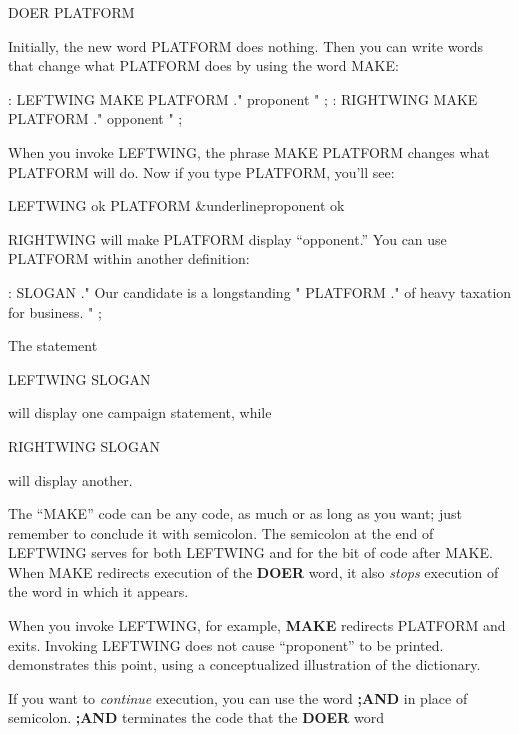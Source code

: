 \begin{Code}
DOER PLATFORM
\end{Code}
Initially, the new word PLATFORM does nothing. Then you can write
words that change what PLATFORM does by using the word MAKE:

\begin{Code}
: LEFTWING   MAKE PLATFORM  ." proponent " ;
: RIGHTWING  MAKE PLATFORM  ." opponent " ;
\end{Code}
When you invoke LEFTWING, the phrase MAKE PLATFORM changes
what PLATFORM will do. Now if you type PLATFORM, you'll see:

\begin{Code}[commandchars=\&\{\}]
LEFTWING ok
PLATFORM &underline{proponent ok}
\end{Code}
RIGHTWING will make PLATFORM display ``opponent.'' You can use
PLATFORM within another definition:

\begin{Code}
: SLOGAN   ." Our candidate is a longstanding " PLATFORM
   ." of heavy taxation for business. " ;
\end{Code}
The statement

\begin{Code}
LEFTWING SLOGAN
\end{Code}
will display one campaign statement, while

\begin{Code}
RIGHTWING SLOGAN
\end{Code}
will display another.

The ``MAKE'' code can be any \Forth{} code, as much or as long as
you want; just remember to conclude it with semicolon. The semicolon at
the end of LEFTWING serves for both LEFTWING and for the bit of
code after MAKE. When MAKE redirects execution of the \textbf{DOER} word,
it also \emph{stops} execution of the word in which it appears.

When you invoke LEFTWING, for example, \textbf{MAKE} redirects
PLATFORM and exits. Invoking LEFTWING does not cause ``proponent''
to be printed.  demonstrates this point, using a
conceptualized illustration of the dictionary.

If you want to \emph{continue} execution, you can use the word \textbf{;AND} in
place of semicolon. \textbf{;AND} terminates the code that the \textbf{DOER} word


